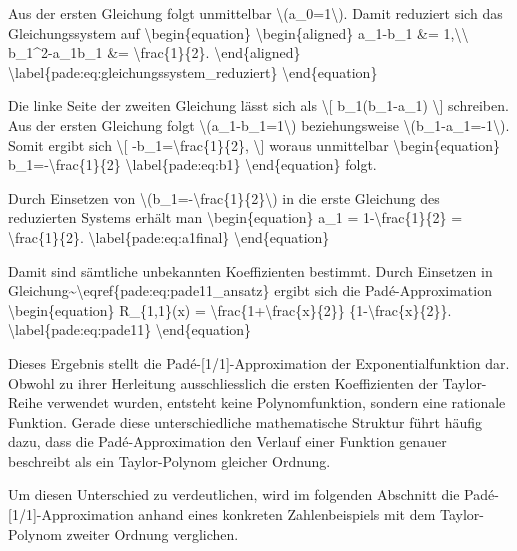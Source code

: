 Aus der ersten Gleichung folgt unmittelbar
\textbackslash(a\_0=1\textbackslash). Damit reduziert sich das
Gleichungssystem auf \textbackslash begin\{equation\}
\textbackslash begin\{aligned\} a\_1-b\_1 \&=
1,\textbackslash\textbackslash{} b\_1\^{}2-a\_1b\_1 \&=
\textbackslash frac\{1\}\{2\}. \textbackslash end\{aligned\}
\textbackslash label\{pade:eq:gleichungssystem\_reduziert\}
\textbackslash end\{equation\}

Die linke Seite der zweiten Gleichung lässt sich als \textbackslash{[}
b\_1(b\_1-a\_1) \textbackslash{]} schreiben. Aus der ersten Gleichung
folgt \textbackslash(a\_1-b\_1=1\textbackslash) beziehungsweise
\textbackslash(b\_1-a\_1=-1\textbackslash). Somit ergibt sich
\textbackslash{[} -b\_1=\textbackslash frac\{1\}\{2\}, \textbackslash{]}
woraus unmittelbar \textbackslash begin\{equation\}
b\_1=-\textbackslash frac\{1\}\{2\} \textbackslash label\{pade:eq:b1\}
\textbackslash end\{equation\} folgt.

Durch Einsetzen von
\textbackslash(b\_1=-\textbackslash frac\{1\}\{2\}\textbackslash) in die
erste Gleichung des reduzierten Systems erhält man
\textbackslash begin\{equation\} a\_1 = 1-\textbackslash frac\{1\}\{2\}
= \textbackslash frac\{1\}\{2\}. \textbackslash label\{pade:eq:a1final\}
\textbackslash end\{equation\}

Damit sind sämtliche unbekannten Koeffizienten bestimmt. Durch Einsetzen
in
Gleichung\textasciitilde\textbackslash eqref\{pade:eq:pade11\_ansatz\}
ergibt sich die Padé-Approximation \textbackslash begin\{equation\}
R\_\{1,1\}(x) = \textbackslash frac\{1+\textbackslash frac\{x\}\{2\}\}
\{1-\textbackslash frac\{x\}\{2\}\}.
\textbackslash label\{pade:eq:pade11\} \textbackslash end\{equation\}

Dieses Ergebnis stellt die Padé-{[}1/1{]}-Approximation der
Exponentialfunktion dar. Obwohl zu ihrer Herleitung ausschliesslich die
ersten Koeffizienten der Taylor-Reihe verwendet wurden, entsteht keine
Polynomfunktion, sondern eine rationale Funktion. Gerade diese
unterschiedliche mathematische Struktur führt häufig dazu, dass die
Padé-Approximation den Verlauf einer Funktion genauer beschreibt als ein
Taylor-Polynom gleicher Ordnung.

Um diesen Unterschied zu verdeutlichen, wird im folgenden Abschnitt die
Padé-{[}1/1{]}-Approximation anhand eines konkreten Zahlenbeispiels mit
dem Taylor-Polynom zweiter Ordnung verglichen.

